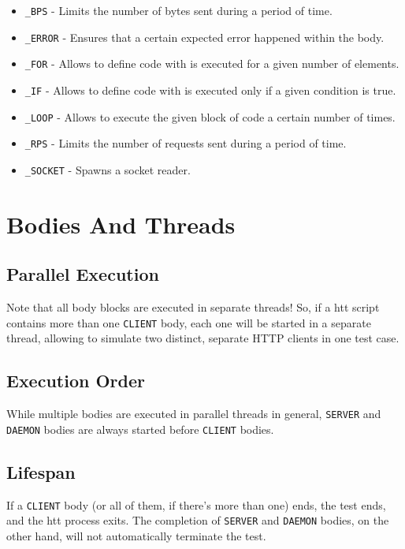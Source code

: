 \begin{itemize}
\item \texttt{\_BPS} - Limits the number of bytes sent during a period of time.
\item \texttt{\_ERROR} - Ensures that a certain expected error happened within the body.
\item \texttt{\_FOR} - Allows to define code with is executed for a given number of elements.
\item \texttt{\_IF} - Allows to define code with is executed only if a given condition is true.
\item \texttt{\_LOOP} - Allows to execute the given block of code a certain number of times.
\item \texttt{\_RPS} - Limits the number of requests sent during a period of time.
\item \texttt{\_SOCKET} - Spawns a socket reader.
\end{itemize}


\newpage 
\section{Bodies And Threads}

\subsection{Parallel Execution}
Note that all body blocks are executed in separate threads! So, if a htt 
script contains more than one \texttt{CLIENT} body, each one will be started in a 
separate thread, allowing to simulate two distinct, separate HTTP clients in 
one test case.

\subsection{Execution Order}
While multiple bodies are executed in parallel threads in general, \texttt{SERVER}
and \texttt{DAEMON} bodies are always started before \texttt{CLIENT} bodies.

\subsection{Lifespan}
If a \texttt{CLIENT} body (or all of them, if there's more than one) ends, 
the test ends, and the htt process exits. The completion of \texttt{SERVER} 
and \texttt{DAEMON} bodies, on the other hand, will not automatically terminate 
the test.

